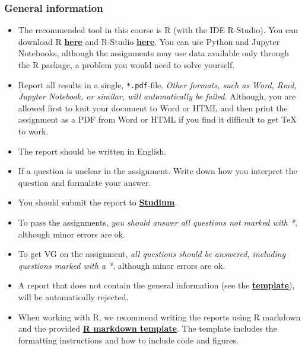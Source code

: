 
\subsubsection*{General information}

\begin{itemize}
\itemsep0em
\item The recommended tool in this course is R (with the IDE R-Studio). You can download R \href{https://cran.r-project.org/}{\textbf{here}} and R-Studio \href{https://www.rstudio.com/products/rstudio/download/}{\textbf{here}}. You can use Python and Jupyter Notebooks, although the assignments may use data available only through the R package, a problem you would need to solve yourself.

\item  Report all results in a single, \texttt{*.pdf}-file. \emph{Other formats, such as Word, Rmd, Jupyter Notebook, or similar, will automatically be failed.} Although, you are allowed first to knit your document to Word or HTML and then print the assignment as a PDF from Word or HTML if you find it difficult to get TeX to work.

\item The report should be written in English.

\item If a question is unclear in the assignment. Write down how you interpret the question and formulate your answer.

\item You should submit the report to \href{https://studium.uu.se/}{\textbf{Studium}}.

\item To pass the assignments, \emph{you should answer all questions not marked with *}, although minor errors are ok.

\item To get VG on the assignment, \emph{all questions should be answered, including questions marked with a *}, although minor errors are ok.

\item A report that does not contain the general information (see the \href{https://raw.githubusercontent.com/MansMeg/IntroML/master/templates/assignment_template.pdf}{\textbf{template}}), will be automatically rejected.

\item When working with R, we recommend writing the reports using R markdown and the provided \href{https://raw.githubusercontent.com/MansMeg/IntroML/master/templates/assignment_template.rmd}{\textbf{R markdown template}}. The template includes the formatting instructions and how to include code and figures.


\end{itemize}
